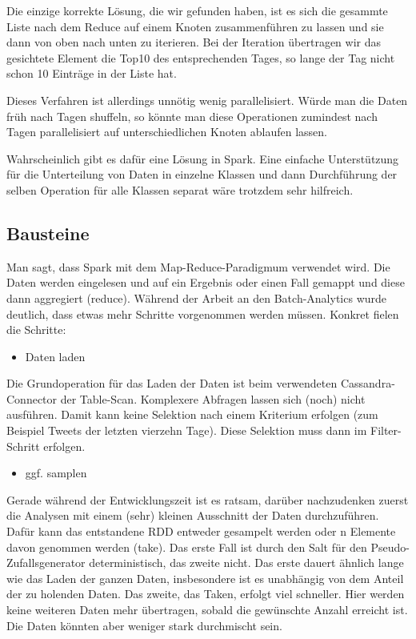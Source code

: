 Die einzige korrekte Lösung, die wir gefunden haben, ist es sich die
gesammte Liste nach dem Reduce auf einem Knoten zusammenführen zu
lassen und sie dann von oben nach unten zu iterieren. Bei der Iteration
übertragen wir das gesichtete Element die Top10 des entsprechenden
Tages, so lange der Tag nicht schon 10 Einträge in der Liste hat.

Dieses Verfahren ist allerdings unnötig wenig parallelisiert. Würde man
die Daten früh nach Tagen shuffeln, so könnte man diese Operationen
zumindest nach Tagen parallelisiert auf unterschiedlichen Knoten
ablaufen lassen.

Wahrscheinlich gibt es dafür eine Lösung in Spark. Eine einfache
Unterstützung für die Unterteilung von Daten in einzelne Klassen und
dann Durchführung der selben Operation für alle Klassen separat wäre
trotzdem sehr hilfreich. \ 

\subsection{Bausteine}
Man sagt, dass Spark mit dem Map-Reduce-Paradigmum verwendet wird. Die
Daten werden eingelesen und auf ein Ergebnis oder einen Fall gemappt
und diese dann aggregiert (reduce). Während der Arbeit an den
Batch-Analytics wurde deutlich, dass etwas mehr Schritte vorgenommen
werden müssen. Konkret fielen die Schritte:

\begin{itemize}
\item Daten laden
\end{itemize}
Die Grundoperation für das Laden der Daten ist beim verwendeten
Cassandra-Connector der Table-Scan. Komplexere Abfragen lassen sich
(noch) nicht ausführen. Damit kann keine Selektion nach einem Kriterium
erfolgen (zum Beispiel Tweets der letzten vierzehn Tage). Diese
Selektion muss dann im Filter-Schritt erfolgen.

\begin{itemize}
\item ggf. samplen
\end{itemize}
Gerade während der Entwicklungszeit ist es ratsam, darüber nachzudenken
zuerst die Analysen mit einem (sehr) kleinen Ausschnitt der Daten
durchzuführen. Dafür kann das entstandene RDD entweder gesampelt werden
oder n Elemente davon genommen werden (take). Das erste Fall ist durch den
Salt für den Pseudo-Zufallsgenerator deterministisch, das zweite nicht.
Das erste dauert ähnlich lange wie das Laden der ganzen Daten,
insbesondere ist es unabhängig von dem Anteil der zu holenden Daten. Das
zweite, das Taken, erfolgt viel schneller. Hier werden keine weiteren
Daten mehr übertragen, sobald die gewünschte Anzahl erreicht ist. Die
Daten könnten aber weniger stark durchmischt sein.

